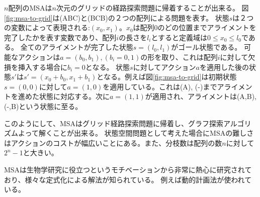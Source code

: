 \documentclass{report}
\begin{document}
$n$配列のMSAは$n$次元のグリッドの経路探索問題に帰着することが出来る。
図\ref{fig:msa-to-grid}は(ABC)と(BCB)の２つの配列による問題を表す。
状態$s$は２つの変数によって表現される:$(x_0, x_1)$。$x_0$は配列0のどの位置までアライメントを完了したかを表す変数であり、配列$i$の長さを$l_i$とすると定義域は$0 \leq x_0 \leq l_0$である。
全てのアライメントが完了した状態$s=(l_0, l_1)$がゴール状態である。
可能なアクションは$a=(b_0, b_1), (b_i=0, 1)$の形を取り、これは配列$i$に対して欠損を挿入する場合に$b_i=0$となる。
状態$s$に対してアクション$a$を適用した後の状態$s'$は$s'=(x_0+b_0, x_1+b_1)$となる。例えば図\ref{fig:msa-to-grid}は初期状態$s=(0,0)$に対して$a=(1,0)$を適用している。これは(A), (-)までアライメントを進めた状態に対応する。次に$a=(1,1)$が適用され、アライメントは(A,B), (-,B)という状態に至る。

このようにして、MSAはグリッド経路探索問題に帰着し、グラフ探索アルゴリズムよって解くことが出来る。
状態空間問題として考えた場合にMSAの難しさはアクションのコストが幅広いことにある。また、分枝数は配列の数$n$に対して$2^n-1$と大きい。

MSAは生物学研究に役立つというモチベーションから非常に熱心に研究されており、様々な定式化による解法が知られている。
例えば動的計画法が使われている。



\begin{figure}
\centering
{} \hspace{4pt}
 \hspace{4pt}
\end{figure}
\end{document}
